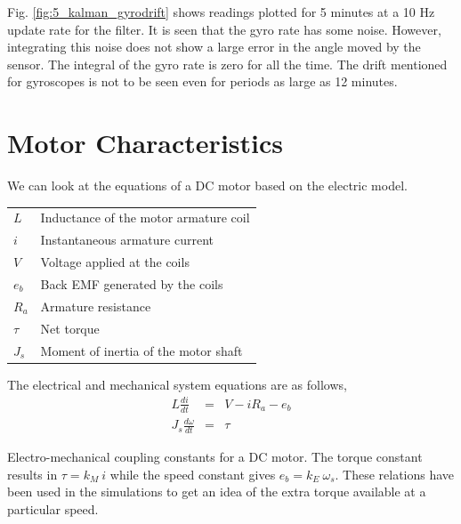Fig. \ref{fig:5_kalman_gyrodrift} shows readings plotted for 5 minutes at a 10 Hz update rate for the filter. It is seen that the
gyro rate has some noise. However, integrating this noise does not show a large error in the angle moved by the sensor. The
integral of the gyro rate is zero for all the time. The drift mentioned for gyroscopes is not to be seen even for periods as large as
12 minutes.

\section{Motor Characteristics}
We can look at the equations of a DC motor based on the electric model.\\
\begin{tabular}{l@{ : }l}
    $L$ & Inductance of the motor armature coil \\
    $i$ & Instantaneous armature current \\
    $V$ & Voltage applied at the coils \\
    $e_b$ & Back EMF generated by the coils \\
    $R_a$ & Armature resistance \\
    $\tau$ & Net torque \\
    $J_s$ & Moment of inertia of the motor shaft
\end{tabular}
\vspace{0.2in}

The electrical and mechanical system equations are as follows,
\begin{eqnarray}
L\frac{di}{dt} &=& V - iR_a - e_b \\
J_s\frac{d\omega}{dt} &=& \tau
\label{eqn:5_motoreqns}
\end{eqnarray}

Electro-mechanical coupling constants for a DC motor. The torque constant results in $\tau = k_M\:i$ while the speed constant gives
$e_b = k_E\:\omega_s$. These relations have been used in the simulations to get an idea of the extra torque available at a particular speed.

